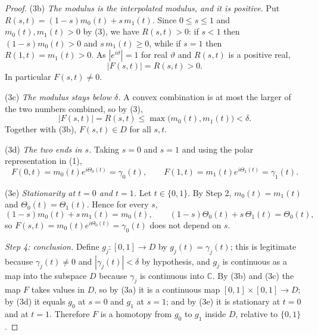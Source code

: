 \begin{proof}
(3b) \emph{The modulus is the interpolated modulus, and it is positive.}  Put
$R(s,t)=(1-s)m_0(t)+s\,m_1(t)$.  Since $0\le s\le1$ and $m_0(t),m_1(t)>0$ by
(3), we have $R(s,t)>0$: if $s<1$ then $(1-s)m_0(t)>0$ and
$s\,m_1(t)\ge0$, while if $s=1$ then $R(1,t)=m_1(t)>0$.  As
$|e^{i\vartheta}|=1$ for real $\vartheta$ and $R(s,t)$ is a positive real,
\[
  |F(s,t)|=R(s,t)>0 .
\]
In particular $F(s,t)\neq0$.

(3c) \emph{The modulus stays below $\delta$.}  A convex combination is at most
the larger of the two numbers combined, so by (3),
\[
  |F(s,t)|=R(s,t)\le\max\bigl(m_0(t),m_1(t)\bigr)<\delta .
\]
Together with (3b), $F(s,t)\in D$ for all $s,t$.

(3d) \emph{The two ends in $s$.}  Taking $s=0$ and $s=1$ and using the polar
representation in (1),
\[
  F(0,t)=m_0(t)e^{i\Theta_0(t)}=\gamma_0(t),
  \qquad
  F(1,t)=m_1(t)e^{i\Theta_1(t)}=\gamma_1(t).
\]

(3e) \emph{Stationarity at $t=0$ and $t=1$.}  Let $t\in\{0,1\}$.  By Step 2,
$m_0(t)=m_1(t)$ and $\Theta_0(t)=\Theta_1(t)$.  Hence for every $s$,
\[
  (1-s)m_0(t)+s\,m_1(t)=m_0(t),
  \qquad
  (1-s)\Theta_0(t)+s\,\Theta_1(t)=\Theta_0(t),
\]
so $F(s,t)=m_0(t)e^{i\Theta_0(t)}=\gamma_0(t)$ does not depend on $s$.

\emph{Step 4: conclusion.}  Define $g_j\colon[0,1]\to D$ by $g_j(t)=\gamma_j(t)$;
this is legitimate because $\gamma_j(t)\neq0$ and $|\gamma_j(t)|<\delta$ by
hypothesis, and $g_j$ is continuous as a map into the subspace $D$ because
$\gamma_j$ is continuous into $\mathbb{C}$.  By (3b) and (3c) the map $F$ takes
values in $D$, so by (3a) it is a continuous map
$[0,1]\times[0,1]\to D$; by (3d) it equals $g_0$ at $s=0$ and $g_1$ at $s=1$;
and by (3e) it is stationary at $t=0$ and at $t=1$.  Therefore $F$ is a
homotopy from $g_0$ to $g_1$ inside $D$, relative to $\{0,1\}$.
\end{proof}
